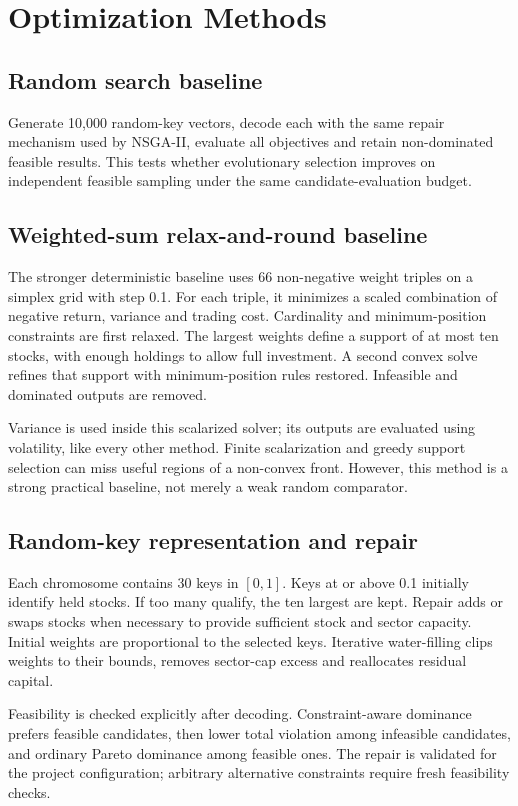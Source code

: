 \documentclass[12pt,a4paper]{article}
\newcommand{\newsec}[1]{\section{#1}}
\begin{document}
\newsec{Optimization Methods}
\subsection{Random search baseline}
Generate 10,000 random-key vectors, decode each with the same repair mechanism used by NSGA-II, evaluate all objectives and retain non-dominated feasible results. This tests whether evolutionary selection improves on independent feasible sampling under the same candidate-evaluation budget.
\subsection{Weighted-sum relax-and-round baseline}
The stronger deterministic baseline uses 66 non-negative weight triples on a simplex grid with step 0.1. For each triple, it minimizes a scaled combination of negative return, variance and trading cost. Cardinality and minimum-position constraints are first relaxed. The largest weights define a support of at most ten stocks, with enough holdings to allow full investment. A second convex solve refines that support with minimum-position rules restored. Infeasible and dominated outputs are removed.

Variance is used inside this scalarized solver; its outputs are evaluated using volatility, like every other method. Finite scalarization and greedy support selection can miss useful regions of a non-convex front. However, this method is a strong practical baseline, not merely a weak random comparator.
\subsection{Random-key representation and repair}
Each chromosome contains 30 keys in $[0,1]$. Keys at or above 0.1 initially identify held stocks. If too many qualify, the ten largest are kept. Repair adds or swaps stocks when necessary to provide sufficient stock and sector capacity. Initial weights are proportional to the selected keys. Iterative water-filling clips weights to their bounds, removes sector-cap excess and reallocates residual capital.

Feasibility is checked explicitly after decoding. Constraint-aware dominance prefers feasible candidates, then lower total violation among infeasible candidates, and ordinary Pareto dominance among feasible ones. The repair is validated for the project configuration; arbitrary alternative constraints require fresh feasibility checks.
\end{document}

